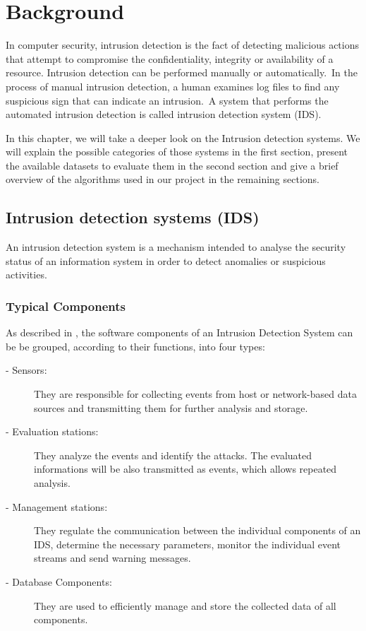 \chapter{Background}
\label{background}

	In computer security, intrusion detection is the fact of detecting malicious actions that attempt to compromise the confidentiality, integrity or availability of a resource. Intrusion detection can be performed manually or automatically.\ In the process of manual intrusion detection, a human examines log files to find any suspicious sign that can indicate an intrusion.\ A system that performs the automated intrusion detection is called intrusion detection system (IDS).

	In this chapter, we will take a deeper look on the Intrusion detection systems. We will explain the possible categories of those systems in the first section, present the available datasets to evaluate them in the second section and give a brief overview of the algorithms used in our project in the remaining sections.

	\section{Intrusion detection systems (IDS)}

		An intrusion detection system is a mechanism intended to analyse the security status of an information system in order to detect anomalies or suspicious activities.

		\subsection{Typical Components }

			As described in \cite{BSI}, the software components of an Intrusion Detection System can be be grouped, according to their functions, into four types:

			\begin{description}
				\item[- Sensors:] They are responsible for collecting  events from host or network-based data sources and transmitting them for further analysis and storage.

				\item [- Evaluation stations:] They analyze the events and identify the attacks. The evaluated informations will be also transmitted as events, which allows repeated analysis. 
				\item [- Management stations:] They regulate the communication between the individual components of an IDS, determine the necessary parameters, monitor the individual event streams and send warning messages.
				\item [- Database Components:] They are used to efficiently manage and store the collected data of all components.

			\end{description}

